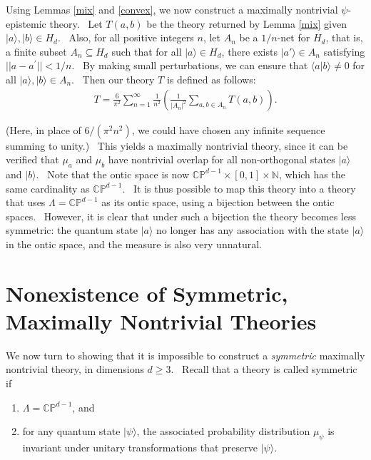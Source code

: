 \documentclass[letterpaper,12pt]{article}
\begin{document}
Using Lemmas \ref{mix} and \ref{convex}, we now construct a maximally
nontrivial $\psi$-epistemic theory. \ Let $T(a,b)$ be the theory
returned by Lemma \ref{mix} given $ | a \rangle , | b
\rangle \in H_d$. \ Also, for all positive integers $n$, let $A_n$ be a $%
1/n$-net for $H_d$, that is, a finite subset $A_n\subseteq H_d$ such that
for all $ | a \rangle \in H_d$, there exists $ | a'
\rangle \in A_n$ satisfying $||a-a^{\prime }||<1/n$. \ By making
small perturbations, we can ensure that $ \langle a | b \rangle
\neq 0$ for all $ | a \rangle , | b \rangle \in A_n$. \ Then our theory $T$ is defined as follows:
\begin{eqnarray}
T = \frac{6}{\pi^2}\sum_{n=1}^{\infty}\frac{1}{n^2}\left(\frac{1}{|A_n|^2}%
\sum_{a,b\in A_n} T(a,b)\right).
\end{eqnarray}

\noindent (Here, in place of $6/(\pi^{2} n^{2})$, we could have chosen any infinite sequence summing to unity.) \ This yields a maximally nontrivial theory, since it can be verified that $%
\mu_{a}$ and $\mu_{b}$ have nontrivial overlap for all non-orthogonal
states $ | a \rangle $ and $ | b \rangle $. \ Note
that the ontic space is now $\mathbb{CP}^{d-1}\times [0,1]\times \mathbb{N}$, which has the same
cardinality as $\mathbb{CP}^{d-1}$. \ It is thus possible to map this theory into a theory
that uses $\Lambda=\mathbb{CP}^{d-1}$ as its ontic space, using a bijection between the
ontic spaces. \ However, it is clear that under such a bijection the theory
becomes less symmetric: the quantum state $ | a \rangle $ no
longer has any association with the state $ | a \rangle $ in the
ontic space, and the measure is also very unnatural.

\section{Nonexistence of Symmetric, Maximally Nontrivial Theories}

\label{nonexistence} We now turn to showing that it is impossible to
construct a \textit{symmetric} maximally nontrivial theory, in dimensions $%
d\geq 3$. \ Recall that a theory is called symmetric if

\begin{enumerate}
\item $\Lambda=\mathbb{CP}^{d-1}$, and

\item for any quantum state $ | \psi \rangle $, the associated
probability distribution $\mu_{\psi}$ is invariant under unitary
transformations that preserve $ | \psi \rangle $.
\end{enumerate}
\end{document}
